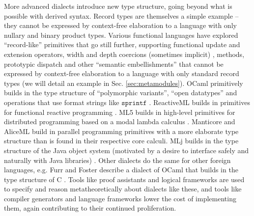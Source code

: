 More advanced dialects introduce new type structure, going beyond what is possible with derived syntax. Record types are themselves a simple example -- they cannot be expressed by context-free elaboration to a language with only nullary and binary product types. Various functional languages have explored ``record-like'' primitives that go still further, supporting functional update and extension operators, width and depth coercions (sometimes implicit)%
, methods, prototypic dispatch and other ``semantic embellishments'' that cannot be expressed by context-free elaboration to a language with only standard record types (we will detail an  example in Sec. \ref{sec:metamodules}). OCaml primitively builds in the type structure of ``polymorphic variants'', ``open datatypes'' and  operations that use format strings like $\mathtt{sprintf}$ \cite{ocaml-manual}. ReactiveML builds in primitives for functional reactive programming \cite{mandel2005reactiveml}. ML5 builds in high-level primitives for distributed programming based on a modal lambda calculus \cite{Murphy:2007:TDP:1793574.1793585}. Manticore \cite{conf/popl/FluetRRSX07} and AliceML  \cite{AliceLookingGlass} build in parallel programming primitives with a more elaborate type structure than is found in their respective core calculi. 
MLj builds in the type structure of the Java object system (motivated by a desire to interface safely and naturally with Java libraries) \cite{Benton:1999:IWW:317636.317791}. Other dialects do the same for other foreign languages, e.g. Furr and Foster describe a dialect of OCaml that builds in the type structure of C \cite{Furr:2005:CTS:1065010.1065019}. Tools like proof assistants and logical frameworks are used to specify and reason metatheoretically about dialects like these, and tools like compiler generators and language frameworks \cite{erdweg2013state} lower the cost of implementing them, again contributing to their continued proliferation. 


